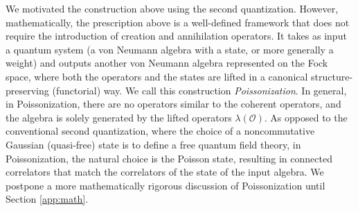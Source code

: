 \documentclass[a4paper,11pt]{article}
\theoremstyle{definition}
\numberwithin{equation}{section}
\begin{document}
We motivated the construction above using the second quantization. However, mathematically, the prescription above is a well-defined framework that does not require the introduction of creation and annihilation operators. It takes as input a quantum system (a von Neumann algebra with a state, or more generally a weight) and outputs another von Neumann algebra represented on the Fock space, where both the operators and the states are lifted in a canonical structure-preserving (functorial) way. We call this construction {\it Poissonization}. In general, in Poissonization, there are no operators similar to the coherent operators, and the algebra is solely generated by the lifted operators $\lambda(\mathcal{O})$. As opposed to the conventional second quantization, where the choice of a noncommutative Gaussian (quasi-free) state is to define a free quantum field theory, in Poissonization, the natural choice is the Poisson state, resulting in connected correlators that match the correlators of the state of the input algebra. We postpone a more mathematically rigorous discussion of Poissonization until Section \ref{app:math}.
\end{document}
